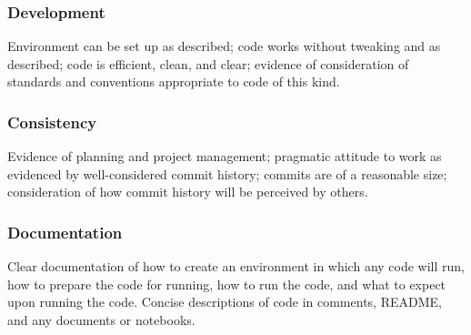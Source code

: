 \documentclass[a4paper, 12pt]{scrartcl}
\begin{document}
    \subsubsection*{Development}
    Environment can be set up as described; code works without tweaking and as described; code is efficient, clean, and clear; evidence of consideration of standards and conventions appropriate to code of this kind.
    \subsubsection*{Consistency}
    Evidence of planning and project management; pragmatic attitude to work as evidenced by well-considered commit history; commits are of a reasonable size; consideration of how commit history will be perceived by others.
    \subsubsection*{Documentation}
    Clear documentation of how to create an environment in which any code will run, how to prepare the code for running, how to run the code, and what to expect upon running the code. Concise descriptions of code in comments, README, and any documents or notebooks.
    
  
  
  
\end{document}
